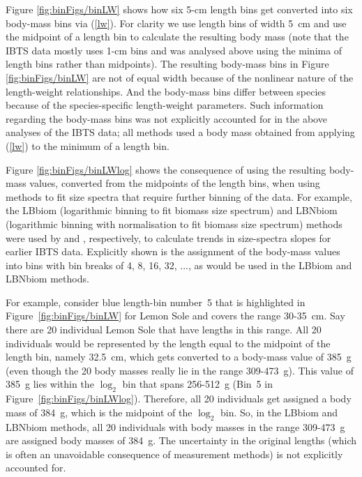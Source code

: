 \documentclass[12pt, letter]{article}
\newcommand{\logtwo}{\log_{\mathrm{2}}}
\begin{document}
Figure \ref{fig:binFigs/binLW} shows how six 5-cm length bins get converted into
six body-mass bins via (\ref{lw}).
For clarity we use length bins of width 5~cm and use the midpoint of a
length bin to calculate the resulting body
mass (note that the IBTS data mostly uses 1-cm bins and
was analysed above using the minima of length bins rather than midpoints).
The resulting body-mass bins in Figure \ref{fig:binFigs/binLW} are not of equal
width because of the nonlinear nature of the length-weight relationships. And
the body-mass bins differ between species because of the species-specific
length-weight parameters. Such information regarding the body-mass bins was not
explicitly accounted for in the above analyses of the IBTS data; all methods
used a body mass obtained from applying (\ref{lw}) to the minimum of a length
bin.

Figure \ref{fig:binFigs/binLWlog} shows the consequence of using the resulting
body-mass values, converted from the midpoints of the length bins, when using
methods to fit size spectra that require further binning of the data. For
example, the LBbiom
(logarithmic binning to fit biomass size spectrum)
and LBNbiom (logarithmic binning with normalisation to fit biomass size
spectrum)
methods were used by \citet{jd05} and
\citet{pj05}, respectively, to calculate trends in size-spectra slopes for
earlier IBTS data. Explicitly shown is the assignment of the body-mass values
into bins with bin breaks of 4, 8, 16, 32, ..., as would be used in the LBbiom
and LBNbiom methods.

For example, consider blue length-bin number~5 that is highlighted in
Figure~\ref{fig:binFigs/binLW} for Lemon Sole and covers the range
30-35~cm. Say there are 20 individual Lemon Sole that have lengths in this
range. All 20 individuals would be represented by the length equal to the
midpoint of the length bin, namely 32.5~cm, which gets converted to a body-mass
value of 385~g (even though the 20 body masses really lie in the range
309-473~g). This value of 385~g lies within the $\logtwo$ bin that spans
256-512~g (Bin~5 in Figure~\ref{fig:binFigs/binLWlog}). Therefore, all 20
individuals get assigned a body mass of 384~g, which is the midpoint of the
$\logtwo$ bin. So, in the LBbiom and LBNbiom methods, all 20 individuals with
body masses in the range 309-473~g are assigned body masses of 384~g. The
uncertainty in the original lengths
(which is often an unavoidable consequence of measurement methods)
is not explicitly accounted for.
\end{document}
